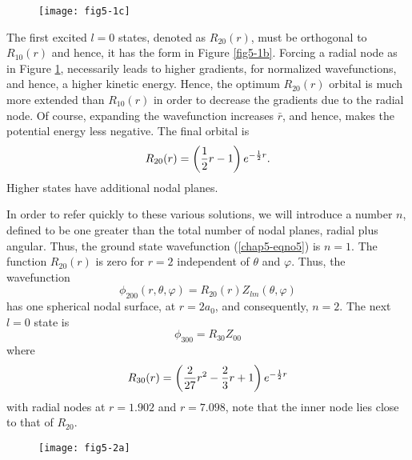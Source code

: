 \begin{figure}
\begin{center}
\texttt{[image: fig5-1c]}
\end{center}
\caption{}
\label{fig5-1c}
\end{figure}

The first excited $l = 0$ states, denoted as $R_{20} (r)$, must be
orthogonal to $R_{10} (r)$ and hence, it has the form in Figure
\ref{fig5-1b}.  Forcing a radial node as in Figure \ref{fig5-1c},
necessarily leads to higher gradients, for normalized wavefunctions,
and hence, a higher kinetic energy.
Hence, the optimum $R_{20}(r)$ orbital is much more extended than 
$R_{10}(r)$ in order to decrease the gradients due to the radial node.  Of 
course, expanding the wavefunction increases ${\bar r}$, and hence, makes 
the potential energy less negative.  The final orbital is
\begin{equation}
R_{20} (r) = \left( {1 \over 2} r - 1 \right) e^{-{1 \over 2}r}.
\end{equation}
Higher states have additional nodal planes.

In order to refer quickly to these various solutions, we will
introduce a number $n$, defined to be one greater than the total
number of nodal planes, radial plus angular.  Thus, the ground state
wavefunction (\ref{chap5-eqno5}) is $n = 1$.  The function $R_{20}(r)$
is zero for $r = 2$ independent of $\theta$ and $\varphi$.  Thus, the
wavefunction
\begin{equation}
\phi_{200} \left( r , \theta , \varphi \right) = R_{20} (r) Z_{lm} ( 
\theta , \varphi )
\end{equation}
has one spherical nodal surface, at $r = 2a_0$, and consequently, $n = 
2$.  The next $l = 0$ state is
\begin{equation}
\phi_{300} = R_{30} Z_{00}
\end{equation}
where
\begin{equation}
R_{30}(r) = \left( {2 \over 27} r^2 - {2 \over 3} r+1 \right) e^{-{1 \over 
2}r}
\end{equation}
with radial nodes at $r = 1.902$ and $r = 7.098$, note that the inner node 
lies close to that of $R_{20}$.

\begin{figure}
\begin{center}
\texttt{[image: fig5-2a]}
\end{center}
\caption{}
\label{fig5-2a}
\end{figure}

